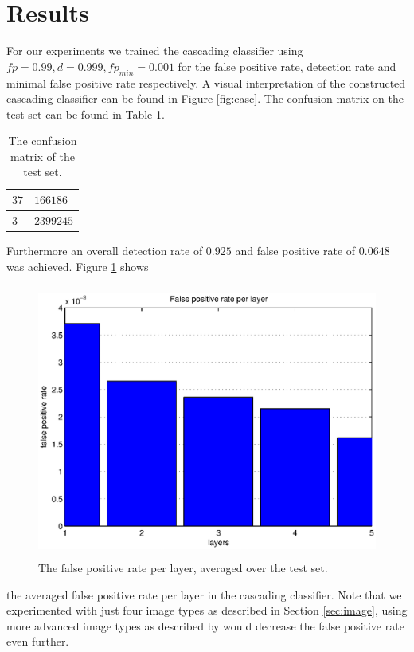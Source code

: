 \documentclass[a4paper,11pt]{article}
\begin{document}
\section{Results} \label{sec:res}
For our experiments we trained the cascading classifier using $fp = 0.99, d =
0.999, fp_{min} = 0.001$ for the false positive rate, detection rate and
minimal false positive rate respectively. A visual interpretation of the
constructed cascading classifier can be found in Figure \ref{fig:casc}. The
confusion matrix on the test set can be found in Table \ref{tab:conf}. 
\begin{table}[!ht]
\centering
\begin{tabular}{|l|l|}
\hline
$37$ & $166186$ \\
\hline
$3$  & $2399245$ \\
\hline
\end{tabular}
\caption{The confusion matrix of the test set.}
\label{tab:conf}
\end{table}
Furthermore an overall detection rate of $0.925$ and false positive rate of
$0.0648$ was achieved. Figure \ref{fig:fprate} shows
\begin{figure}[!ht]
\centering
\includegraphics[height=9cm]{img/fprate}
\caption{The false positive rate per layer, averaged over the test set.}
\label{fig:fprate}
\end{figure}
the averaged false positive rate per layer in the cascading classifier. Note
that we experimented with just four image types as described in Section
\ref{sec:image}, using more advanced image types as described by \cite{naturaltext}
would decrease the false positive rate even further.
\end{document}
